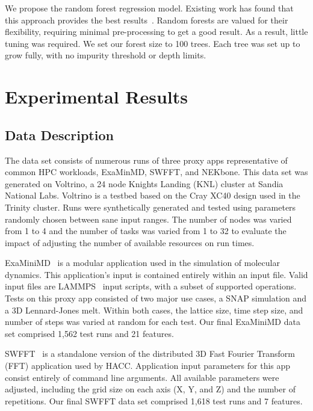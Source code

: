 \documentclass[conference, 10pt, onecolumn, draftclsnofoot]{IEEEtran}
\begin{document}
We propose the random forest regression model.
Existing work has found that this approach provides the best results~\cite{survey,7776517,PRIONN,10.1007/978-3-030-48340-1_48}.
Random forests are valued for their flexibility, requiring minimal pre-processing to get a good result.
As a result, little tuning was required.
We set our forest size to 100 trees.
Each tree was set up to grow fully, with no impurity threshold or depth limits.

\section{Experimental Results}

\subsection{Data Description}
The data set consists of numerous runs of three proxy apps representative of common HPC workloads, ExaMinMD, SWFFT, and NEKbone.
This data set was generated on Voltrino, a 24 node Knights Landing (KNL) cluster at Sandia National Labs.
Voltrino is a testbed based on the Cray XC40 design used in the Trinity cluster\cite{Trinity}.
Runs were synthetically generated and tested using parameters randomly chosen between sane input ranges.
The number of nodes was varied from 1 to 4 and the number of tasks was varied from 1 to 32 to evaluate the impact of adjusting the number of available resources on run times.

ExaMiniMD~\cite{ExaMiniMD} is a modular application used in the simulation of molecular dynamics.
This application's input is contained entirely within an input file.
Valid input files are LAMMPS~\cite{LAAMPS} input scripts, with a subset of supported operations.
Tests on this proxy app consisted of two major use cases, a SNAP simulation and a 3D Lennard-Jones melt.
Within both cases, the lattice size, time step size, and number of steps was varied at random for each test.
Our final ExaMiniMD data set comprised 1,562 test runs and 21 features.

SWFFT~\cite{SWFFT} is a standalone version of the distributed 3D Fast Fourier Transform (FFT) application used by HACC.
Application input parameters for this app consist entirely of command line arguments.
All available parameters were adjusted, including the grid size on each axis (X, Y, and Z) and the number of repetitions.
Our final SWFFT data set comprised 1,618 test runs and 7 features.
\end{document}
